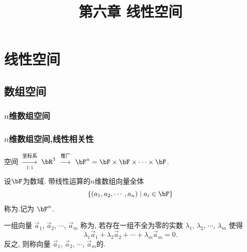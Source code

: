 \renewcommand{\mydate}{2025年04月03号\ 第十二次课}

\makeatletter
\ifodd\value{page}
\else
\begin{frame}[plain]
\end{frame}
\fi
\makeatother

\section{线性空间}


\title{第六章 \quad 线性空间}
\author{}
\date{}

\frame{\titlepage}

\subsection{数组空间}





\subsubsection{$n$维数组空间}
\begin{frame}\frametitle{$n$维数组空间,线性相关性}
\begin{center}
空间 $\xrightarrow[1:1]{\text{坐标系}}$ $\bR^3$ $\xrightarrow{\text{推广}}$ $\bF^n=\bF\times \bF\times \cdots \times \bF$.
\end{center}
\pp
\begin{definition}
设$\bF$为数域. 带线性运算的$n$维数组向量全体
\[\{(a_1,a_2,\cdots,a_n)\mid a_i\in \bF\}\]
称为.记为 $\bF^n$.
\end{definition}

\pp


\pp

\begin{definition}
一组向量 $\vec{a}_1$, $\vec{a}_2$, $\cdots$, $\vec{a}_m$ 称为, 若存在一组不全为零的实数 $\lambda_1$, $\lambda_2$, $\cdots$, $\lambda_m$ 使得
\[\lambda_1\vec{a}_1 + \lambda_2\vec{a}_2 + \cdots + \lambda_m\vec{a}_m=0.\]
反之,	则称向量 $\vec{a}_1$, $\vec{a}_2$, $\cdots$, $\vec{a}_m$的.
\end{definition}
\end{frame}



